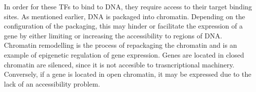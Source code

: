         In order for these TFs to bind to DNA, they require access to their target binding sites. As mentioned earlier, DNA is packaged into chromatin. Depending on the configuration of the packaging, this may hinder or facilitate the expression of a gene by either limiting or increasing the accessibility to regions of DNA. Chromatin remodelling is the process of repackaging the chromatin and is an example of epigenetic regulation of gene expression. Genes are located in closed chromatin are silenced, since it is not accesible to trasncriptional machinery. Conversely, if a gene is located in open chromatin, it may be expressed due to the lack of an accessibility problem.
    
        
        
        

